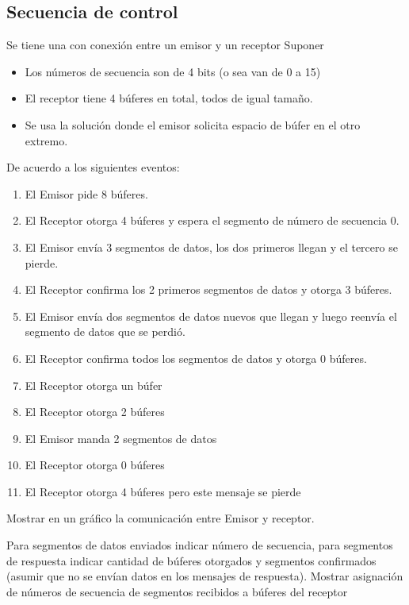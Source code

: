 \documentclass[12pt]{report}
\begin{document}
\begin{exer}
\subsection{Secuencia de control \sthree \shard}
Se tiene una con conexión entre un emisor y un receptor
Suponer
\begin{itemize}
\item Los números de secuencia son de 4 bits (o sea van de 0 a 15)
\item El receptor tiene 4 búferes en total, todos de igual tamaño.
\item Se usa la solución donde el emisor solicita espacio de búfer en el otro extremo.
\end{itemize}

De acuerdo a los siguientes eventos:

\begin{enumerate}
\item El Emisor pide 8 búferes.
\item El Receptor otorga 4 búferes y espera el segmento de número de secuencia 0.
\item El Emisor envía 3 segmentos de datos, los dos primeros llegan y el tercero se pierde.
\item El Receptor confirma los 2 primeros segmentos de datos y otorga 3 búferes.
\item El Emisor envía dos segmentos de datos nuevos que llegan y luego reenvía el segmento de datos que se perdió.
\item El Receptor confirma todos los segmentos de datos y otorga 0 búferes.
\item El Receptor otorga un búfer
\item El Receptor otorga 2 búferes
\item El Emisor manda 2 segmentos de datos
\item El Receptor otorga 0 búferes
\item El Receptor otorga 4 búferes pero este mensaje se pierde
\end{enumerate}

Mostrar en un gráfico la comunicación entre Emisor y receptor. 

Para segmentos de datos enviados indicar número de secuencia, para segmentos de respuesta
indicar cantidad de búferes otorgados y segmentos confirmados (asumir que no se envían datos en los mensajes de respuesta). Mostrar asignación de números de secuencia de segmentos recibidos a búferes del receptor
\end{exer}
\end{document}
